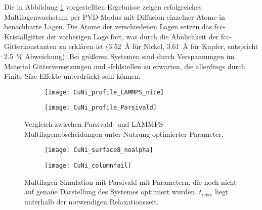 Die in Abbildung \ref{fig:multilayerresults} vorgestellten Ergebnisse zeigen erfolgreiches Multilagenwachstum per PVD-Modus mit Diffusion einzelner Atome in benachbarte Lagen.
Die Atome der verschiedenen Lagen setzen das fcc-Kristallgitter der vorherigen Lage fort, was durch die Ähnlichkeit der fcc-Gitterkonstanten zu erklären ist (\SI{3.52}{\angstrom} für Nickel, \SI{3.61}{\angstrom} für Kupfer, entspricht \SI{2.5}{\percent} Abweichung).
Bei größeren Systemen sind durch Verspannungen im Material Gitterversetzungen und -fehlstellen zu erwarten, die allerdings durch Finite-Size-Effekte unterdrückt sein können.

\begin{figure}[hp]
  \captionsetup[subfigure]{singlelinecheck=false}
  \def\subfigwidth{7cm}
  \begin{subfigure}[t]{\subfigwidth}
    \texttt{[image: CuNi\_profile\_LAMMPS\_nice]}
  \end{subfigure}
  \hfill
  \begin{subfigure}[t]{\subfigwidth}
    \texttt{[image: CuNi\_profile\_Parsivald]}
  \end{subfigure}
  \caption[Vergleich zwischen Parsivald- und LAMMPS-Multilagenabscheidungen]{
    Vergleich zwischen Parsivald- und LAMMPS-Multilagenabscheidungen unter Nutzung optimierter Parameter.
  }
  \label{fig:multilayerresults}
\end{figure}

\begin{figure}[hp]
  \captionsetup[subfigure]{singlelinecheck=false}
  \begin{subfigure}[t]{8cm}
    \texttt{[image: CuNi\_surface8\_noalpha]}
  \end{subfigure}
  \hfill
  \begin{subfigure}[t]{6cm}
    \texttt{[image: CuNi\_columnfail]}
  \end{subfigure}
  \caption[Multilagen-Simulation mit willkürlichen Parametern]{
    Multilagen-Simulation mit Parsivald mit Parametern, die noch nicht auf genaue Darstellung des Systemes optimiert wurden.
    $t_\text{relax}$ liegt unterhalb der notwendigen Relaxationszeit.
  }
  \label{fig:multilayerfails}
\end{figure}
